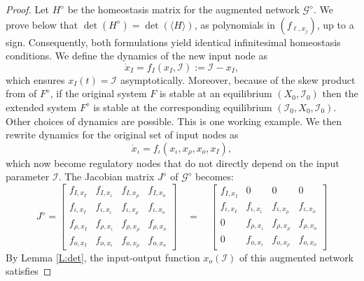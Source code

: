 \documentclass[pdflatex,sn-basic,Numbered]{sn-jnl}
\newcommand{\II}{{\mathcal I}}
\theoremstyle{thmstyleone}%
\newcommand{\Matrixc}[1]{\ensuremath{\left[\begin{array}{cccccccccccc|ccc} #1 \end{array}\right]}}
\numberwithin{equation}{section}
\begin{document}
\begin{proof} 
Let $H^\diamond$ be the homeostasis matrix for the augmented network $\mathcal{G}^\diamond$. 
We prove below that $\det(H^\diamond) = \det(\langle H \rangle)$, as polynomials in $(f_{\ell,x_j})$, up to a sign.
Consequently, both formulations yield identical infinitesimal homeostasis conditions.
We define the dynamics of the new input node as 
\[
\dot{x}_{I}=f_I(x_{I},\mathcal{I}) := \mathcal{I}-x_I,
\]
which ensures $x_I(t) = \mathcal{I}$ asymptotically.
Moreover, because of the skew product from of $F^\diamond$, if the original system $F$ is stable at an equilibrium $(X_0,\II_0)$ then the extended system $F^\diamond$ is stable at the corresponding equilibrium $(\II_0,X_0,\II_0)$. 
Other choices of dynamics are possible. 
This is one working example. 
We then rewrite dynamics for the original set of input nodes as 
\[
\dot{x}_{\iota} = f_{\iota}(x_\iota,x_\rho,x_o, x_I),
\]
which now become regulatory nodes that do not directly depend on the input parameter $\mathcal{I}$. 
The Jacobian matrix $J^\diamond$ of $\mathcal{G}^\diamond$ becomes:
\[
J^\diamond = \begin{bmatrix}
f_{I, x_{I}} & f_{I, x_{\iota}} & f_{I, x_{\rho}} & f_{I, x_o} \\
f_{\iota, x_{I}} & f_{\iota, x_{\iota}} & f_{\iota, x_{\rho}} & f_{\iota, x_o} \\
f_{\rho, x_{I}} & f_{\rho, x_{\iota}} & f_{\rho, x_{\rho}} & f_{\rho, x_o} \\
f_{o, x_{I}} & f_{o, x_{\iota}} & f_{o, x_{\rho}} & f_{o, x_o}
\end{bmatrix}
\quad=\quad
\begin{bmatrix}
f_{I, x_{I}} & 0 & 0 & 0 \\
f_{\iota, x_{I}} & f_{\iota, x_{\iota}} & f_{\iota, x_{\rho}} & f_{\iota, x_o} \\
0 & f_{\rho, x_{\iota}} & f_{\rho, x_{\rho}} & f_{\rho, x_o} \\
0 & f_{o, x_{\iota}} & f_{o, x_{\rho}} & f_{o, x_o}
\end{bmatrix}
\]
By Lemma \ref{L:det}, the input-output function $x_o(\mathcal{I})$ of this augmented network satisfies 

\end{proof}
\end{document}
